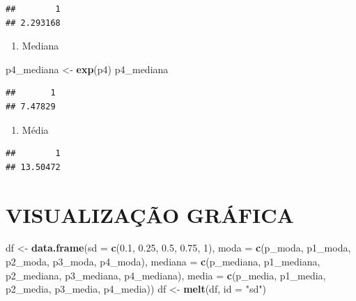 \documentclass[]{article}
\newenvironment{Shaded}{\begin{snugshade}}{\end{snugshade}}
\newcommand{\KeywordTok}[1]{\textcolor[rgb]{0.13,0.29,0.53}{\textbf{#1}}}
\newcommand{\DataTypeTok}[1]{\textcolor[rgb]{0.13,0.29,0.53}{#1}}
\newcommand{\DecValTok}[1]{\textcolor[rgb]{0.00,0.00,0.81}{#1}}
\newcommand{\FloatTok}[1]{\textcolor[rgb]{0.00,0.00,0.81}{#1}}
\newcommand{\StringTok}[1]{\textcolor[rgb]{0.31,0.60,0.02}{#1}}
\newcommand{\OperatorTok}[1]{\textcolor[rgb]{0.81,0.36,0.00}{\textbf{#1}}}
\newcommand{\NormalTok}[1]{#1}
\providecommand{\tightlist}{%
  \setlength{\itemsep}{0pt}\setlength{\parskip}{0pt}}
\begin{document}
\begin{verbatim}
##        1 
## 2.293168
\end{verbatim}

\begin{enumerate}
\def\labelenumi{\alph{enumi}.}
\setcounter{enumi}{1}
\tightlist
\item
  Mediana
\end{enumerate}

\begin{Shaded}
\begin{Highlighting}[]
\NormalTok{p4_mediana <-}\StringTok{ }\KeywordTok{exp}\NormalTok{(p4)}
\NormalTok{p4_mediana}
\end{Highlighting}
\end{Shaded}

\begin{verbatim}
##       1 
## 7.47829
\end{verbatim}

\begin{enumerate}
\def\labelenumi{\alph{enumi}.}
\setcounter{enumi}{2}
\tightlist
\item
  Média
\end{enumerate}

\begin{Shaded}
\end{Shaded}

\begin{verbatim}
##        1 
## 13.50472
\end{verbatim}

\section{VISUALIZAÇÃO GRÁFICA}\label{visualizacao-grafica}

\begin{Shaded}
\begin{Highlighting}[]
\NormalTok{df <-}\StringTok{ }\KeywordTok{data.frame}\NormalTok{(}\DataTypeTok{sd =} \KeywordTok{c}\NormalTok{(}\FloatTok{0.1}\NormalTok{, }\FloatTok{0.25}\NormalTok{, }\FloatTok{0.5}\NormalTok{, }\FloatTok{0.75}\NormalTok{, }\DecValTok{1}\NormalTok{),}
                 \DataTypeTok{moda =} \KeywordTok{c}\NormalTok{(p_moda, p1_moda, p2_moda, p3_moda, p4_moda),}
                 \DataTypeTok{mediana =} \KeywordTok{c}\NormalTok{(p_mediana, p1_mediana, p2_mediana, p3_mediana, p4_mediana),}
                 \DataTypeTok{media =} \KeywordTok{c}\NormalTok{(p_media, p1_media, p2_media, p3_media, p4_media))}
\NormalTok{df <-}\StringTok{ }\KeywordTok{melt}\NormalTok{(df, }\DataTypeTok{id =} \StringTok{"sd"}\NormalTok{)}
\end{Highlighting}
\end{Shaded}
\end{document}
